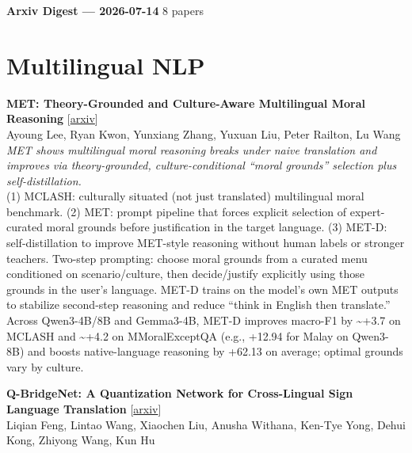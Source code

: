 \documentclass[12pt,letterpaper]{article}
\begin{document}
{\footnotesize\textbf{Arxiv Digest --- 2026-07-14} \hfill 8 papers}

\smallskip

\section*{Multilingual NLP}

{\small\textbf{MET: Theory-Grounded and Culture-Aware Multilingual Moral Reasoning}} {\scriptsize[\href{https://arxiv.org/abs/2607.11736}{arxiv}]}\\
{\scriptsize Ayoung Lee, Ryan Kwon, Yunxiang Zhang, Yuxuan Liu, Peter Railton, Lu Wang}\\

{\small\textit{MET shows multilingual moral reasoning breaks under naive translation and improves via theory-grounded, culture-conditional ``moral grounds'' selection plus self-distillation.}}\\[1pt]
{\footnotesize (1) MCLASH: culturally situated (not just translated) multilingual moral benchmark. (2) MET: prompt pipeline that forces explicit selection of expert-curated moral grounds before justification in the target language. (3) MET-D: self-distillation to improve MET-style reasoning without human labels or stronger teachers. Two-step prompting: choose moral grounds from a curated menu conditioned on scenario/culture, then decide/justify explicitly using those grounds in the user's language. MET-D trains on the model's own MET outputs to stabilize second-step reasoning and reduce ``think in English then translate.'' Across Qwen3-4B/8B and Gemma3-4B, MET-D improves macro-F1 by \textasciitilde{}+3.7 on MCLASH and \textasciitilde{}+4.2 on MMoralExceptQA (e.g., +12.94 for Malay on Qwen3-8B) and boosts native-language reasoning by +62.13 on average; optimal grounds vary by culture.}

\medskip

{\small\textbf{Q-BridgeNet: A Quantization Network for Cross-Lingual Sign Language Translation}} {\scriptsize[\href{https://arxiv.org/abs/2607.11215}{arxiv}]}\\
{\scriptsize Liqian Feng, Lintao Wang, Xiaochen Liu, Anusha Withana, Ken-Tye Yong, Dehui Kong, Zhiyong Wang, Kun Hu}\\
\end{document}
